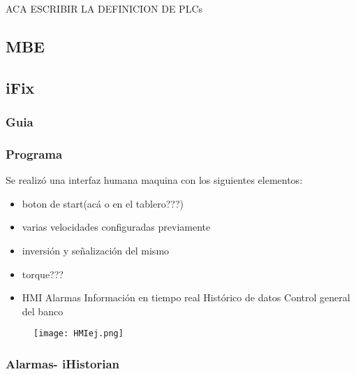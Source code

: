 \begin{tcolorbox}[colback=blue!5!white,colframe=blue!75!black,title=Definición]
	ACA ESCRIBIR LA DEFINICION DE PLCs
\end{tcolorbox}

\subsection{MBE}
\subsection{iFix}
\subsubsection{Guia}
\subsubsection{Programa}


Se realizó una interfaz humana maquina con los siguientes elementos:
\begin{itemize}
	\item boton de start(acá o en el tablero???)
	\item varias velocidades configuradas previamente
	\item inversión y señalización del mismo
	\item torque???
	\item HMI
	      \subitem Alarmas
	      \subitem Información en tiempo real
	      \subitem Histórico de datos
	      \subitem Control general del banco
\end{itemize}
\begin{figure}[htb]
	\centering
	\texttt{[image: HMIej.png]}
\end{figure}

\subsubsection{Alarmas- iHistorian}